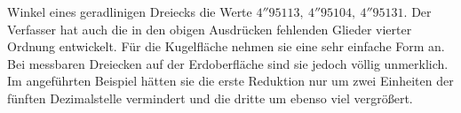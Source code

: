 %
Winkel eines geradlinigen Dreiecks die Werte \(4''95113,\ 4''95104,\ 4''95131\). Der Verfasser hat auch die in den obigen Ausdrücken fehlenden Glieder vierter Ordnung entwickelt. Für die Kugelfläche nehmen sie eine sehr einfache Form an. Bei messbaren Dreiecken auf der Erdoberfläche sind sie jedoch völlig unmerklich. Im angeführten Beispiel hätten sie die erste Reduktion nur um zwei Einheiten der fünften Dezimalstelle vermindert und die dritte um ebenso viel vergrößert.

